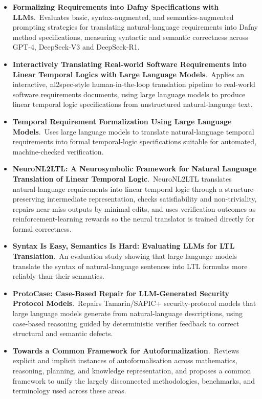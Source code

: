 \documentclass[natbib=false,acmsmall,nonacm,11pt]{acmart}
\begin{document}
\begin{itemize}
\item \textbf{Formalizing Requirements into Dafny Specifications with LLMs}.~Evaluates basic, syntax-augmented, and semantics-augmented prompting strategies for translating natural-language requirements into Dafny method specifications, measuring syntactic and semantic correctness across GPT-4, DeepSeek-V3 and DeepSeek-R1.~\cite{DBLP:conf/icfem/LuZZY25}
\item \textbf{Interactively Translating Real-world Software Requirements into Linear Temporal Logics with Large Language Models}.~Applies an interactive, nl2spec-style human-in-the-loop translation pipeline to real-world software requirements documents, using large language models to produce linear temporal logic specifications from unstructured natural-language text.~\cite{DBLP:conf/qrs/ZhouYZYL25}
\item \textbf{Temporal Requirement Formalization Using Large Language Models}.~Uses large language models to translate natural-language temporal requirements into formal temporal-logic specifications suitable for automated, machine-checked verification.~\cite{Hu_2026}
\item \textbf{NeuroNL2LTL: A Neurosymbolic Framework for Natural Language Translation of Linear Temporal Logic}.~NeuroNL2LTL translates natural-language requirements into linear temporal logic through a structure-preserving intermediate representation, checks satisfiability and non-triviality, repairs near-miss outputs by minimal edits, and uses verification outcomes as reinforcement-learning rewards so the neural translator is trained directly for formal correctness.~\cite{QuansahBonnah2026NeuroNL2LTL}
\item \textbf{Syntax Is Easy, Semantics Is Hard: Evaluating LLMs for LTL Translation}.~An evaluation study showing that large language models translate the syntax of natural-language sentences into LTL formulas more reliably than their semantics.~\cite{DBLP:conf/secdev/DansoHBC26}
\item \textbf{ProtoCase: Case-Based Repair for LLM-Generated Security Protocol Models}.~Repairs Tamarin/SAPIC+ security-protocol models that large language models generate from natural-language descriptions, using case-based reasoning guided by deterministic verifier feedback to correct structural and semantic defects.~\cite{DBLP:conf/iccbr/Zhang26}
\item \textbf{Towards a Common Framework for Autoformalization}.~Reviews explicit and implicit instances of autoformalisation across mathematics, reasoning, planning, and knowledge representation, and proposes a common framework to unify the largely disconnected methodologies, benchmarks, and terminology used across these areas.~\cite{DBLP:conf/aaai/MensfeltCFKTS26}

\end{itemize}
\end{document}
